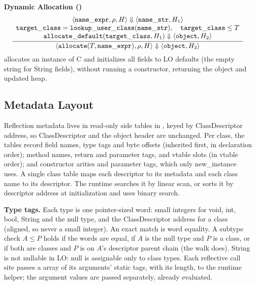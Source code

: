 \textbf{Dynamic Allocation ()}
\[
\dfrac{\begin{array}{c}
  \langle \mathtt{name\_expr}, \rho, H\rangle \Downarrow \langle \mathtt{name\_str}, H_1\rangle \\
  \mathtt{target\_class} = \mathtt{lookup\_user\_class}(\mathtt{name\_str}), \quad \mathtt{target\_class} \le T \\
  \mathtt{allocate\_default}(\mathtt{target\_class}, H_1) \Downarrow \langle \mathtt{object}, H_2\rangle
\end{array}}{
  \langle \mathtt{allocate}(T, \mathtt{name\_expr}), \rho, H\rangle \Downarrow \langle \mathtt{object}, H_2\rangle
}
\]
{\small *\textbf{} allocates an instance of C and
initializes all fields to LO defaults (the empty string for String fields),
without running a constructor, returning the object and updated heap.}


\subsection*{Metadata Layout}
Reflection metadata lives in read-only side tables
in , keyed by ClassDescriptor address, so ClassDescriptor and
the object header are unchanged. Per class, the tables record field names,
type tags and byte offsets (inherited first, in declaration order); method
names, return and parameter tags, and vtable slots (in vtable order); and
constructor arities and parameter tags, which only new\_instance uses. A
single class table maps each descriptor to its metadata and each class name
to its descriptor. The runtime searches it by linear scan, or sorts it by
descriptor address at initialization and uses binary search.

\textbf{Type tags.} Each type is one pointer-sized word: small integers for
void, int, bool, String and the null type, and the ClassDescriptor address
for a class (aligned, so never a small integer). An exact match is word
equality. A subtype check $A \le P$ holds if the words are equal, if $A$ is
the null type and $P$ is a class, or if both are classes and $P$ is on $A$'s
descriptor parent chain (the walk  does). String is not
nullable in LO: null is assignable only to class types. Each reflective call
site passes a  array of its arguments' static tags, with its
length, to the runtime helper; the argument values are passed separately,
already evaluated.
